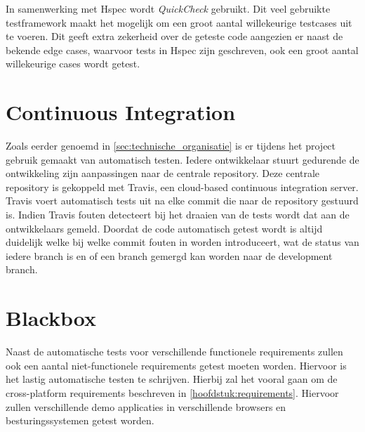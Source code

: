 In samenwerking met Hspec wordt \emph{QuickCheck}\cite{QuickCheck} gebruikt. Dit veel gebruikte testframework maakt het mogelijk om een groot aantal willekeurige testcases uit te voeren. Dit geeft extra zekerheid over de geteste code aangezien er naast de bekende edge cases, waarvoor tests in Hspec zijn geschreven, ook een groot aantal willekeurige cases wordt getest.


\section{Continuous Integration}
Zoals eerder genoemd in \autoref{sec:technische_organisatie} is er tijdens het project gebruik gemaakt van automatisch testen. Iedere ontwikkelaar stuurt gedurende de ontwikkeling zijn aanpassingen naar de centrale repository. Deze centrale repository is gekoppeld met Travis, een cloud-based continuous integration server. Travis voert automatisch tests uit na elke commit die naar de repository gestuurd is. Indien Travis fouten detecteert bij het draaien van de tests wordt dat aan de ontwikkelaars gemeld. Doordat de code automatisch getest wordt is altijd duidelijk welke bij welke commit fouten in worden introduceert, wat de status van iedere branch is en of een branch gemergd kan worden naar de development branch.

\section{Blackbox}
Naast de automatische tests voor verschillende functionele requirements zullen ook een aantal niet-functionele requirements getest moeten worden. Hiervoor is het lastig automatische testen te schrijven. Hierbij zal het vooral gaan om de cross-platform requirements beschreven in \autoref{hoofdstuk:requirements}. Hiervoor zullen verschillende demo applicaties in verschillende browsers en besturingssystemen getest worden.
